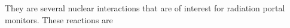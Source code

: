 They are several nuclear interactions that are of interest for radiation portal monitors. These reactions are
